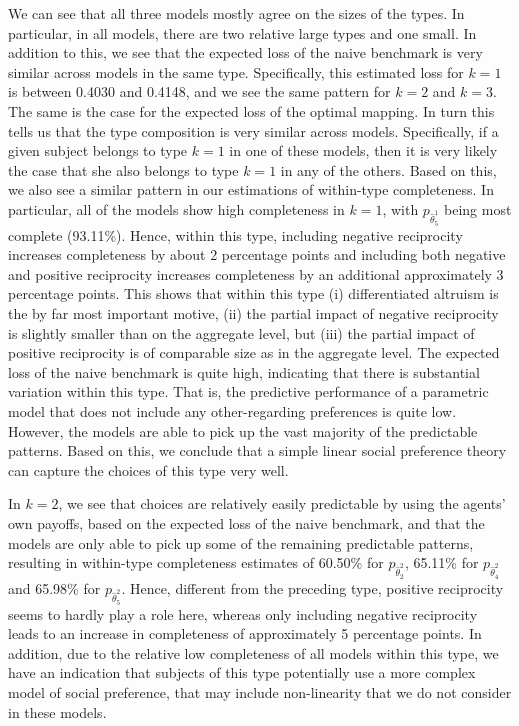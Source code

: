 \documentclass[11pt,a4paper]{article}
\theoremstyle{definition}
\begin{document}
We can see that all three models mostly agree on the sizes of the types. In particular, in all models, there are two relative large types and one small. In addition to this, we see that the expected loss of the naive benchmark is very similar across models in the same type. Specifically, this estimated loss for \(k=1\) is between 0.4030 and 0.4148, and we see the same pattern for \(k=2\) and \(k=3\).  The same is the case for the expected loss of the optimal mapping.  In turn this tells us that the type composition is very similar across models. Specifically, if a given subject belongs to type \(k=1\) in one of these models, then it is very likely the case that she also belongs to type \(k=1\) in any of the others. Based on this, we also see a similar pattern in our estimations of within-type completeness. In particular, all of the models show high completeness in \(k=1\), with \(p_{\hat{\theta}_{5}^1}\) being most complete (93.11\%). Hence, within this type, including negative reciprocity increases completeness by about 2 percentage points and including both negative and positive reciprocity increases completeness by an additional approximately 3 percentage points. This shows that within this type (i) differentiated altruism is the by far most important motive, (ii) the partial impact of negative reciprocity is slightly smaller than on the aggregate level, but (iii) the partial impact of positive reciprocity is of comparable size as in the aggregate level. The expected loss of the naive benchmark is quite high, indicating that there is substantial variation within this type. That is, the predictive performance of a parametric model that does not include any other-regarding preferences is quite low. However, the models are able to pick up the vast majority of the predictable patterns. Based on this, we conclude that a simple linear social preference theory can capture the choices of this type very well.

In \(k=2\), we see that choices are relatively easily predictable by using the agents' own payoffs, based on the expected loss of the naive benchmark, and that the models are only able to pick up some of the remaining predictable patterns, resulting in within-type completeness estimates of 60.50\% for \(p_{\hat{\theta}_{2}^2}\), 65.11\% for \(p_{\hat{\theta}_{4}^2}\) and 65.98\% for \(p_{\hat{\theta}_{5}^2}\).  Hence, different from the preceding type, positive reciprocity seems to hardly play a role here, whereas only including negative reciprocity leads to an increase in completeness of approximately 5 percentage points. In addition, due to the relative low completeness of all models within this type, we have an indication that subjects of this type potentially use a more complex model of social preference, that may include non-linearity that we do not consider in these models.
\end{document}
